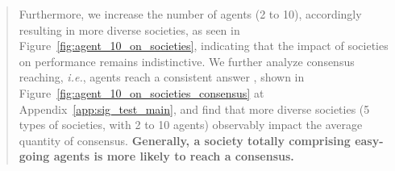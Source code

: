 \documentclass[11pt]{article}
\newcommand{\ie}{\hbox{\emph{i.e.}}\xspace}
\begin{document}
\begin{abstract}
Furthermore, we increase the number of agents (2 to 10), accordingly resulting in more diverse societies, as seen in Figure~\ref{fig:agent_10_on_societies}, indicating that the impact of societies on performance remains indistinctive. 
We further analyze consensus reaching, \ie, agents reach a consistent answer \citep{arXiv2023_Multi-Agent-Consensus}, shown in Figure~\ref{fig:agent_10_on_societies_consensus} at Appendix~\ref{app:sig_test_main}, and find that more diverse societies (5 types of societies, with 2 to 10 agents) observably impact the average quantity of consensus. 
\textbf{Generally, a society totally comprising easy-going agents is more likely to reach a consensus.}  



\end{abstract}
\end{document}
